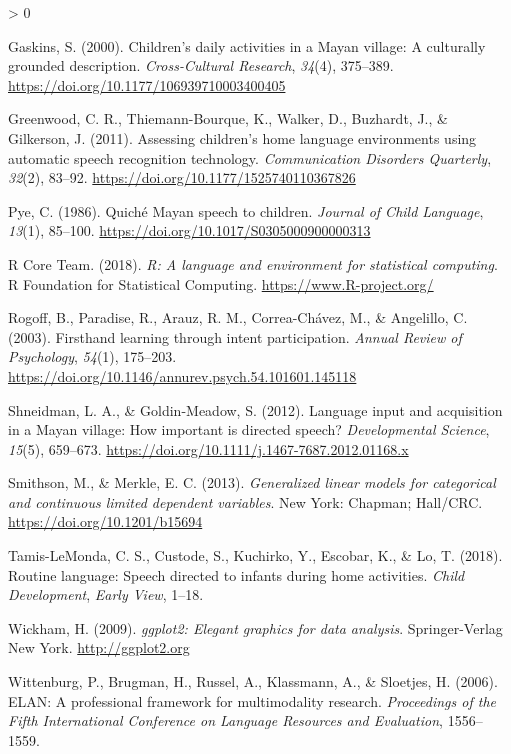 \documentclass[
  english,
  ,man,floatsintext]{apa6}
\newlength{\cslhangindent}
\newenvironment{CSLReferences}[2] %
 {%
  \setlength{\parindent}{0pt}
  \ifodd #1 \everypar{\setlength{\hangindent}{\cslhangindent}}\ignorespaces\fi
  \ifnum #2 > 0
  \setlength{\parskip}{#2\baselineskip}
  \fi
 }%
 {}
\begin{document}
\begin{CSLReferences}{1}{0}
\leavevmode\hypertarget{ref-gaskins2000childrens}{}%
Gaskins, S. (2000). Children's daily activities in a {M}ayan village: A culturally grounded description. \emph{Cross-Cultural Research}, \emph{34}(4), 375--389. \url{https://doi.org/10.1177/106939710003400405}

\leavevmode\hypertarget{ref-greenwood2011assessing}{}%
Greenwood, C. R., Thiemann-Bourque, K., Walker, D., Buzhardt, J., \& Gilkerson, J. (2011). Assessing children's home language environments using automatic speech recognition technology. \emph{Communication Disorders Quarterly}, \emph{32}(2), 83--92. \url{https://doi.org/10.1177/1525740110367826}

\leavevmode\hypertarget{ref-pye1986quiche}{}%
Pye, C. (1986). Quich{é} {M}ayan speech to children. \emph{Journal of Child Language}, \emph{13}(1), 85--100. \url{https://doi.org/10.1017/S0305000900000313}

\leavevmode\hypertarget{ref-R-base}{}%
R Core Team. (2018). \emph{R: A language and environment for statistical computing}. R Foundation for Statistical Computing. \url{https://www.R-project.org/}

\leavevmode\hypertarget{ref-rogoff2003firsthand}{}%
Rogoff, B., Paradise, R., Arauz, R. M., Correa-Chávez, M., \& Angelillo, C. (2003). Firsthand learning through intent participation. \emph{Annual Review of Psychology}, \emph{54}(1), 175--203. \url{https://doi.org/10.1146/annurev.psych.54.101601.145118}

\leavevmode\hypertarget{ref-shneidman2012language}{}%
Shneidman, L. A., \& Goldin-Meadow, S. (2012). Language input and acquisition in a {M}ayan village: How important is directed speech? \emph{Developmental Science}, \emph{15}(5), 659--673. \url{https://doi.org/10.1111/j.1467-7687.2012.01168.x}

\leavevmode\hypertarget{ref-smithson2013generalized}{}%
Smithson, M., \& Merkle, E. C. (2013). \emph{Generalized linear models for categorical and continuous limited dependent variables}. New York: Chapman; Hall/CRC. \url{https://doi.org/10.1201/b15694}

\leavevmode\hypertarget{ref-tamislemonda2018routine}{}%
Tamis-LeMonda, C. S., Custode, S., Kuchirko, Y., Escobar, K., \& Lo, T. (2018). Routine language: Speech directed to infants during home activities. \emph{Child Development}, \emph{Early View}, 1--18.

\leavevmode\hypertarget{ref-R-ggplot2}{}%
Wickham, H. (2009). \emph{ggplot2: Elegant graphics for data analysis}. Springer-Verlag New York. \url{http://ggplot2.org}

\leavevmode\hypertarget{ref-ELAN}{}%
Wittenburg, P., Brugman, H., Russel, A., Klassmann, A., \& Sloetjes, H. (2006). {ELAN}: A professional framework for multimodality research. \emph{{Proceedings of the Fifth International Conference on Language Resources and Evaluation}}, 1556--1559.

\end{CSLReferences}

\endgroup
\end{document}
